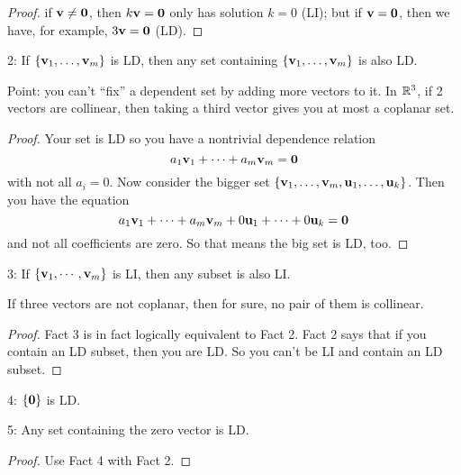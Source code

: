 \begin{proof}  if $\mathbf{v} \neq \mathbf{0}$, then $k\mathbf{v} = \mathbf{0}$ only has solution $k=0$ (LI);
but if $\mathbf{v} = \mathbf{0}$, then we have, for example, $3\mathbf{v} = \mathbf{0}$ (LD). \end{proof}


\begin{fac} 2:  If $\{\mathbf{v}_1, \dots, \mathbf{v}_m\}$ is LD, then any set containing
$\{\mathbf{v}_1, \dots, \mathbf{v}_m\}$ is also LD.\end{fac}

Point: you can't ``fix'' a dependent set by adding more vectors to it.
In $\mathbb{R}^3$, if 2 vectors are collinear, then taking a third vector gives you at most a
coplanar set.

\begin{proof} Your set is LD so 
you have a nontrivial dependence relation
$$
a_1\mathbf{v}_1 + \cdots + a_m \mathbf{v}_m = \mathbf{0}
$$ 
with not all $a_i = 0$.  Now consider the bigger set $\{ \mathbf{v}_1, \ldots, \mathbf{v}_m, \mathbf{u}_1, \dots, \mathbf{u}_k\}$.  
Then you have the equation
$$
 a_1\mathbf{v}_1 + \cdots + a_m \mathbf{v}_m + 0\mathbf{u}_{1} + \cdots + 0\mathbf{u}_k = \mathbf{0}
$$
and not all coefficients are zero.  So that means the big set is
LD, too. \end{proof}

\begin{fac} 3: If $\{ \mathbf{v}_1, \cdots, \mathbf{v}_m\}$ is LI, then any subset is also LI.\end{fac}

\begin{myexample} If three vectors are not coplanar, then for sure, no pair of them is
collinear.\end{myexample}

\begin{proof} Fact 3 is in fact logically equivalent to Fact 2.  
 Fact 2 says that if you contain an LD subset,  then you are LD.
So you can't be LI and contain an LD subset.
\end{proof}

\begin{fac} 4: $\{ \mathbf{0}\}$ is LD.\end{fac}

\begin{fac} 5: Any set containing the zero vector is LD.\end{fac}


\begin{proof} Use Fact 4 with Fact 2. \end{proof}

